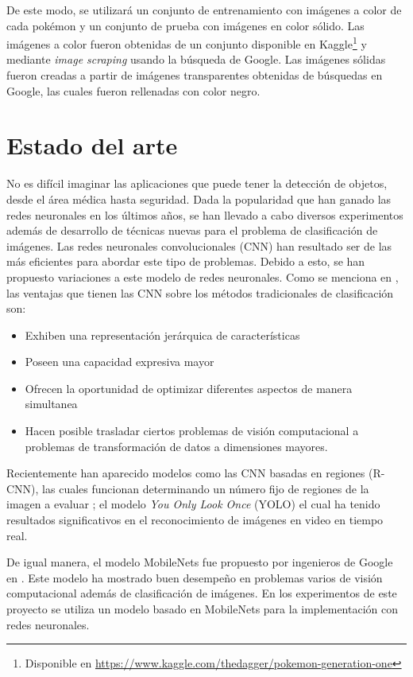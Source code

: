 \documentclass[transmag]{IEEEtran}
\begin{document}
De este modo, se utilizará un conjunto de entrenamiento con imágenes a color de cada pokémon y un conjunto de prueba con imágenes en color sólido. Las imágenes a color fueron obtenidas de un conjunto disponible en Kaggle\footnote{Disponible en \url{https://www.kaggle.com/thedagger/pokemon-generation-one}} y mediante \textit{image scraping} usando la búsqueda de Google. Las imágenes sólidas fueron creadas a partir de imágenes transparentes obtenidas de búsquedas en Google, las cuales fueron rellenadas con color negro. 


\section{Estado del arte}

No es difícil imaginar las aplicaciones que puede tener la detección de objetos, desde el área médica hasta seguridad. Dada la popularidad que han ganado las redes neuronales en los últimos años, se han llevado a cabo diversos experimentos además de desarrollo de técnicas nuevas para el problema de clasificación de imágenes. Las redes neuronales convolucionales (CNN) han resultado ser de las más eficientes para abordar este tipo de problemas. Debido a esto, se han propuesto variaciones  a este modelo de redes neuronales. Como se menciona en \cite{zhao2018object}, las ventajas que tienen las CNN sobre los métodos tradicionales de clasificación son:
\begin{itemize}
	\item Exhiben una representación jerárquica de características
	\item Poseen una capacidad expresiva mayor
	\item Ofrecen la oportunidad de optimizar diferentes aspectos de manera simultanea
	\item Hacen posible trasladar ciertos problemas de visión computacional a problemas de transformación de datos a dimensiones mayores.
\end{itemize}             

Recientemente han aparecido modelos como las CNN basadas en regiones (R-CNN), las cuales funcionan determinando un número fijo de regiones de la imagen a evaluar \cite{girshick}; el modelo \textit{You Only Look Once} (YOLO) \cite{redmon2015look}  el cual ha tenido resultados significativos en el reconocimiento de imágenes en video en tiempo real. 

De igual manera, el modelo MobileNets fue propuesto por ingenieros de Google en  \cite{howard2017mobilenets}. Este modelo ha mostrado buen desempeño en problemas varios de visión computacional además de clasificación de imágenes. En los experimentos de este proyecto se utiliza un modelo basado en MobileNets para la implementación con redes neuronales.
\end{document}
